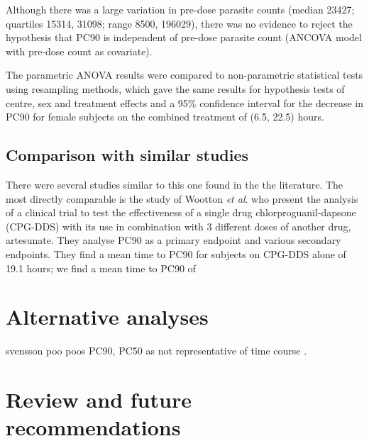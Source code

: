 Although there was a large variation in pre-dose parasite counts (median 23427; quartiles 15314, 31098; range 8500, 196029), there was no evidence to reject the hypothesis that PC90 is independent of pre-dose parasite count (ANCOVA model with pre-dose count as covariate).

The parametric ANOVA results were compared to non-parametric statistical tests using resampling methods, which gave the same results for hypothesis tests of centre, sex and treatment effects and a 95\% confidence interval for the decrease in PC90 for female subjects on the combined treatment of (6.5, 22.5) hours.

\subsection{Comparison with similar studies}
There were several studies similar to this one found in the the literature. The most directly comparable is the study of Wootton {\it et al}. \cite{wootton} who present the analysis of a clinical trial to test the effectiveness of a single drug chlorproguanil-dapsone (CPG-DDS) with its use in combination with 3 different doses of another drug, artesunate. They analyse PC90 as a primary endpoint and various secondary endpoints. They find a mean time to PC90 for subjects on CPG-DDS alone of 19.1 hours; we find a mean time to PC90 of 

\section{Alternative analyses}
svensson poo poos PC90, PC50 as not representative of time course \cite{svensson}.
\section{Review and future recommendations}